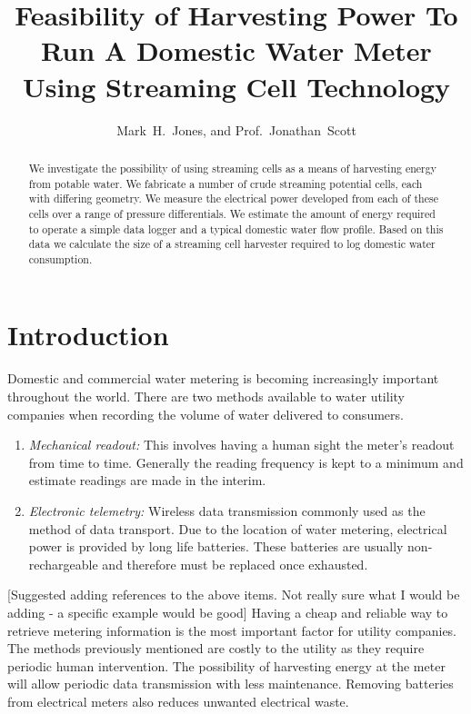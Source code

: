 \documentclass[10pt,final,journal]{IEEEtran}
\title{Feasibility of Harvesting Power To Run A Domestic Water Meter Using Streaming Cell Technology}
\author{Mark~H.~Jones, and Prof.~Jonathan~Scott}
\begin{document}
    \maketitle

    \begin{abstract}
        We investigate the possibility of using streaming cells as a means of harvesting energy from potable water.
        We fabricate a number of crude streaming potential cells, each with differing geometry.
        We measure the electrical power developed from each of these cells over a range of pressure differentials.
        We estimate the amount of energy required to operate a simple data logger and a typical domestic water flow profile.
        Based on this data we calculate the size of a streaming cell harvester required to log domestic water consumption.
    \end{abstract}

    \section{Introduction}
    Domestic and commercial water metering is becoming increasingly important throughout the world.
    There are two methods available to water utility companies when recording the volume of water delivered to consumers.
    \begin{enumerate}
        \item \emph{Mechanical readout:}
            This involves having a human sight the meter's readout from time to time.
            Generally the reading frequency is kept to a minimum and estimate readings are made in the interim.
        \item \emph{Electronic telemetry:}
            Wireless data transmission commonly used as the method of data transport.
            Due to the location of water metering, electrical power is provided by long life batteries.
            These batteries are usually non-rechargeable and therefore must be replaced once exhausted.
        \end{enumerate}
    {[\color{blue}Suggested adding references to the above items. Not really sure what I would be adding - a specific example would be good]}
    Having a cheap and reliable way to retrieve metering information is the most important factor for utility companies.
    The methods previously mentioned are costly to the utility as they require periodic human intervention.
    The possibility of harvesting energy at the meter will allow periodic data transmission with less maintenance.
    Removing batteries from electrical meters also reduces unwanted electrical waste.
\end{document}
